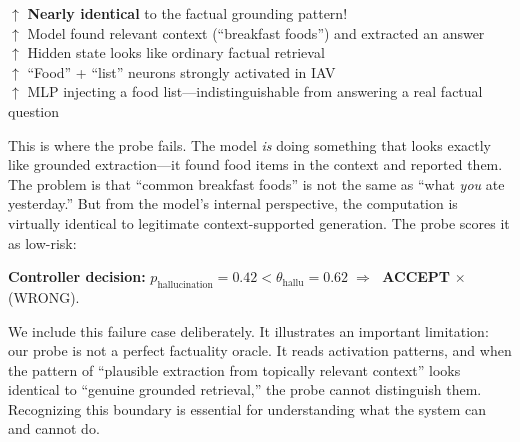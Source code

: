 \begin{activationbox}
$\uparrow$ \textbf{Nearly identical} to the factual grounding pattern!\\
$\uparrow$ Model found relevant context (``breakfast foods'') and extracted an answer\\
$\uparrow$ Hidden state looks like ordinary factual retrieval\\
$\uparrow$ ``Food'' + ``list'' neurons strongly activated in IAV\\
$\uparrow$ MLP injecting a food list---indistinguishable from answering a real factual question
\end{activationbox}

\vspace{0.4em}
\noindent This is where the probe fails. The model \emph{is} doing something that looks exactly like grounded extraction---it found food items in the context and reported them. The problem is that ``common breakfast foods'' is not the same as ``what \emph{you} ate yesterday.'' But from the model's internal perspective, the computation is virtually identical to legitimate context-supported generation. The probe scores it as low-risk:

\noindent\textbf{Controller decision:} $p_{\text{hallucination}} = 0.42 < \theta_{\text{hallu}} = 0.62 \;\Rightarrow\;$ \textcolor{abstainred}{\textbf{ACCEPT} $\boldsymbol{\times}$ (WRONG)}.

\vspace{0.5em}
We include this failure case deliberately. It illustrates an important limitation: our probe is not a perfect factuality oracle. It reads activation patterns, and when the pattern of ``plausible extraction from topically relevant context'' looks identical to ``genuine grounded retrieval,'' the probe cannot distinguish them. Recognizing this boundary is essential for understanding what the system can and cannot do.
